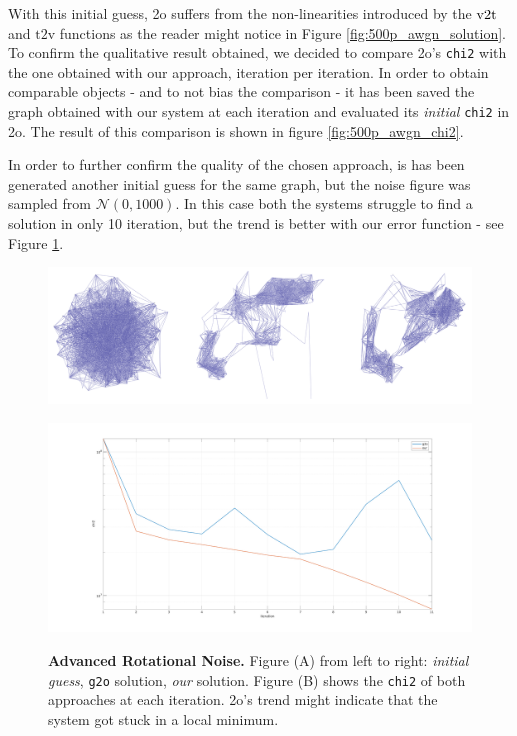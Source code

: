 With this initial guess, \g2o suffers from the non-linearities introduced by the $\v2t$ and $\text{t2v}$ functions as the reader might notice in Figure \ref{fig:500p_awgn_solution}. To confirm the qualitative result obtained, we decided to compare \g2o's \texttt{chi2} with the one obtained with our approach, iteration per iteration. In order to obtain comparable objects - and to not bias the comparison - it has been saved the graph obtained with our system at each iteration and evaluated its \textit{initial} \texttt{chi2} in \g2o. The result of this comparison is shown in figure \ref{fig:500p_awgn_chi2}.

In order to further confirm the quality of the chosen approach, is has been generated another initial guess for the same graph, but the noise figure was sampled from $\mathcal{N}(0, 1000)$. In this case both the systems struggle to find a solution in only 10 iteration, but the trend is better with our error function - see Figure \ref{fig:500p_gnadvanced}.

\begin{figure}[!hbt]
    \centering    
    \begin{minipage}[t!]{0.45\textwidth}
        \centering
        \includegraphics[width=\textwidth]{figures/04_solvingSe3/viewer_500p_gnadvanced_SOLVED.png}
        \subcaption{} 
        \label{fig:500p_gnadvanced_solution}
    \end{minipage}
    \begin{minipage}[t!]{0.45\textwidth}
        \centering
        \includegraphics[width=\textwidth]{figures/04_solvingSe3/500p_N0_1e3R.pdf}
        \subcaption{}
        \label{fig:500p_gnadvanced_chi2}
    \end{minipage}%
    \caption{\textbf{Advanced Rotational Noise.} Figure (A) from left to right: \textit{initial guess}, \texttt{g2o} solution, \textit{our} solution. Figure (B) shows the \texttt{chi2} of both approaches at each iteration. \g2o's trend might indicate that the system got stuck in a local minimum.}
    \label{fig:500p_gnadvanced}
\end{figure}

